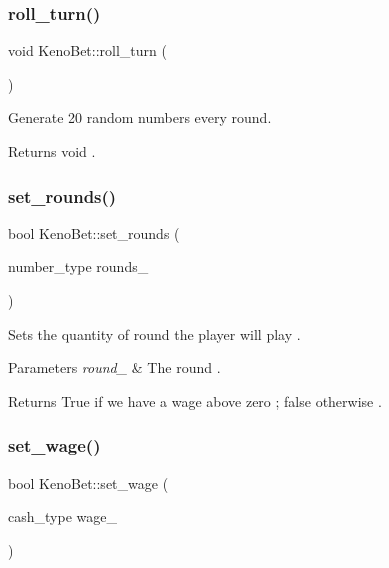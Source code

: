 \subsubsection{\texorpdfstring{roll\+\_\+turn()}{roll\_turn()}}
{\footnotesize\ttfamily void Keno\+Bet\+::roll\+\_\+turn (\begin{DoxyParamCaption}{ }\end{DoxyParamCaption})}



Generate 20 random numbers every round. 

\begin{DoxyReturn}{Returns}
void . 
\end{DoxyReturn}
\mbox{\label{class_keno_bet_a513c7b942977a682d31c2242ca411fe4}} 
\subsubsection{\texorpdfstring{set\+\_\+rounds()}{set\_rounds()}}
{\footnotesize\ttfamily bool Keno\+Bet\+::set\+\_\+rounds (\begin{DoxyParamCaption}\item[{number\+\_\+type}]{rounds\+\_\+ }\end{DoxyParamCaption})}



Sets the quantity of round the player will play . 


\begin{DoxyParams}{Parameters}
{\em round\+\_\+} & The round . \\
\hline
\end{DoxyParams}
\begin{DoxyReturn}{Returns}
True if we have a wage above zero ; false otherwise . 
\end{DoxyReturn}
\mbox{\label{class_keno_bet_ade3e0f73094137c791c22c51bdd9ce55}} 
\subsubsection{\texorpdfstring{set\+\_\+wage()}{set\_wage()}}
{\footnotesize\ttfamily bool Keno\+Bet\+::set\+\_\+wage (\begin{DoxyParamCaption}\item[{cash\+\_\+type}]{wage\+\_\+ }\end{DoxyParamCaption})}



